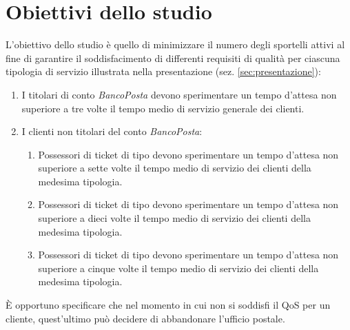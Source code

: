 \section{Obiettivi dello studio}\label{sec:obiettivi}
L'obiettivo dello studio è quello di minimizzare il numero degli sportelli attivi al fine di garantire il soddisfacimento di differenti requisiti di qualità per ciascuna tipologia di servizio illustrata nella presentazione (sez. \ref{sec:presentazione}):

\begin{enumerate}[label=QoS-\arabic*), align=left, leftmargin=*]
\item I titolari di conto \textsl{BancoPosta} devono sperimentare un tempo d'attesa non superiore a tre volte il tempo medio di servizio generale dei clienti.
\item I clienti non titolari del conto \textsl{BancoPosta}:
\begin{enumerate}
\item Possessori di ticket di tipo \uo{} devono sperimentare un tempo d'attesa non superiore a sette volte il tempo medio di servizio dei clienti della medesima tipologia.
\item Possessori di ticket di tipo \pp{} devono sperimentare un tempo d'attesa non superiore a dieci volte il tempo medio di servizio dei clienti della medesima tipologia.
\item Possessori di ticket di tipo \sr{} devono sperimentare un tempo d'attesa non superiore a cinque volte il tempo medio di servizio dei clienti della medesima tipologia.
\end{enumerate}
\end{enumerate}

È opportuno specificare che nel momento in cui non si soddisfi il QoS per un cliente, quest'ultimo può decidere di abbandonare l'ufficio postale.
